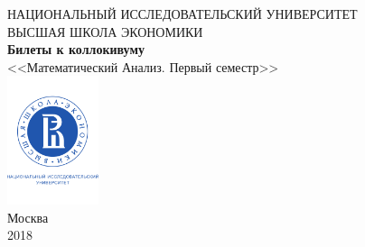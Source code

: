 \documentclass[a4paper, 11pt]{article}
\theoremstyle{definition}
\begin{document}
\begin{titlepage}
	\begin{center}
		$$$$
		$$$$
		$$$$
		$$$$
		{\Large{НАЦИОНАЛЬНЫЙ ИССЛЕДОВАТЕЛЬСКИЙ УНИВЕРСИТЕТ}}\\
		\vspace{0.1cm}
		{\Large{ВЫСШАЯ ШКОЛА ЭКОНОМИКИ}}\\
		\vspace{5.75cm}
		{\Huge\textbf{{Билеты к коллокивуму}}}\\%
		\vspace{1cm}
		{\LARGE{<<Математический Анализ. Первый семестр>>}}\\%
		\vfill
		\includegraphics[width = 0.2\textwidth]{Pictures/HSElogo.pdf}\\
		\vfill
		Москва\\
		2018
	\end{center}
\end{titlepage}


\tableofcontents
\newpage



\end{document}
